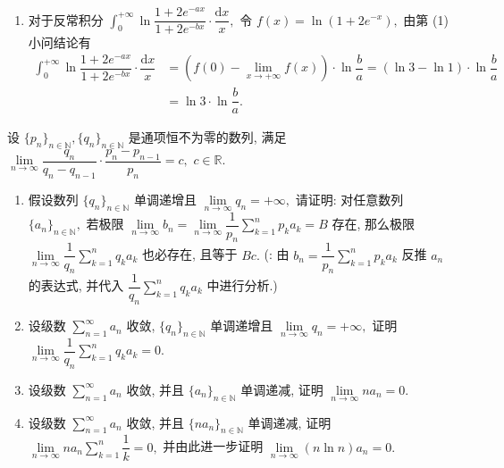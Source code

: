 \begin{solution}
\begin{enumerate}
\item 对于反常积分 $\displaystyle \int_0^{+\infty} \ln \dfrac{1+2e^{-ax}}{1+2e^{-bx}} \cdot \dfrac{\mathrm{d}x}{x},$ 令 $f(x) = \ln(1 + 2e^{-x}),$ 由第 (1) 小问结论有
\begin{align*}
\int_0^{+\infty} \ln \dfrac{1+2e^{-ax}}{1+2e^{-bx}} \cdot \dfrac{\mathrm{d}x}{x} & = (f(0) - \lim_{x \to +\infty} f(x)) \cdot \ln\dfrac{b}{a} = (\ln 3 - \ln 1) \cdot \ln\dfrac{b}{a} \\
& = \ln 3 \cdot \ln\dfrac{b}{a}.
\end{align*}
\end{enumerate}
\end{solution}


\begin{question}[points = 12]
设 $\{ p_n \}_{n \in \mathbb{N}}, \{ q_n \}_{n \in \mathbb{N}}$ 是通项恒不为零的数列, 满足 $\lim\limits_{n\to\infty} \dfrac{q_n}{q_n - q_{n-1}} \cdot \dfrac{p_n - p_{n-1}}{p_n} = c,$ $c \in \mathbb{R}.$ 
\begin{enumerate}
\item 假设数列 $\{ q_n \}_{n \in \mathbb{N}}$ 单调递增且 $\lim\limits_{n \to \infty} q_n = +\infty,$ 请证明: 对任意数列 $\{ a_n \}_{n \in \mathbb{N}},$ 若极限 $\lim\limits_{n \to \infty} b_n = \lim\limits_{n \to \infty} \dfrac{1}{p_n} \sum\limits_{k=1}^n p_ka_k = B$ 存在, 那么极限 $\lim\limits_{n \to \infty} \dfrac{1}{q_n} \sum\limits_{k=1}^n q_ka_k$ 也必存在, 且等于 $Bc.$ (: 由 $\displaystyle b_n = \dfrac{1}{p_n} \sum\limits_{k=1}^n p_ka_k$ 反推 $a_n$ 的表达式, 并代入 $\displaystyle \dfrac{1}{q_n} \sum\limits_{k=1}^n q_ka_k$ 中进行分析.)
\item 设级数 $\sum\limits_{n=1}^\infty a_n$ 收敛, $\{ q_n \}_{n \in \mathbb{N}}$ 单调递增且 $\lim\limits_{n \to \infty} q_n = +\infty,$ 证明 $\lim\limits_{n \to \infty} \dfrac{1}{q_n} \sum\limits_{k=1}^n q_ka_k = 0.$
\item 设级数 $\sum\limits_{n=1}^\infty a_n$ 收敛, 并且 $\{ a_n \}_{n \in \mathbb{N}}$ 单调递减, 证明 $\lim\limits_{n \to \infty} na_n = 0.$
\item 设级数 $\sum\limits_{n=1}^\infty a_n$ 收敛, 并且 $\{ na_n \}_{n \in \mathbb{N}}$ 单调递减, 证明 $\lim\limits_{n \to \infty} na_n \sum\limits_{k=1}^n \dfrac{1}{k} = 0,$ 并由此进一步证明 $\lim\limits_{n \to \infty} (n\ln n)a_n = 0.$
\end{enumerate}

\end{question}

